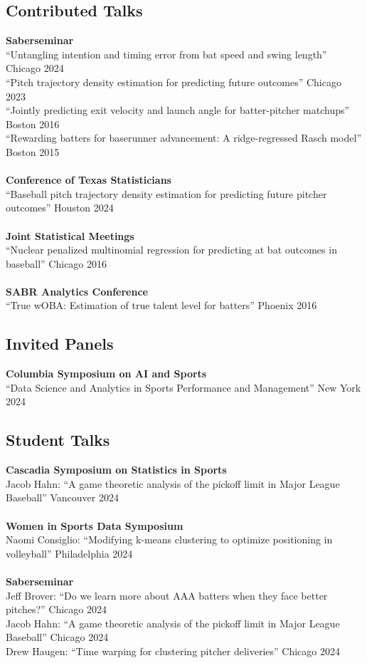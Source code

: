 \documentclass{article}
\begin{document}
\subsection*{\sc Contributed Talks}

{\bf Saberseminar}\\
``Untangling intention and timing error from bat speed and swing length'' \hfill Chicago 2024\\
``Pitch trajectory density estimation for predicting future outcomes'' \hfill Chicago 2023\\
``Jointly predicting exit velocity and launch angle for batter-pitcher matchups'' \hfill Boston 2016\\
``Rewarding batters for baserunner advancement: A ridge-regressed Rasch model'' \hfill Boston 2015\\
~\\
{\bf Conference of Texas Statisticians}\\
``Baseball pitch trajectory density estimation for predicting future pitcher outcomes'' \hfill Houston 2024\\
~\\
{\bf Joint Statistical Meetings}\\
``Nuclear penalized multinomial regression for predicting at bat outcomes in baseball'' \hfill Chicago 2016\\
~\\
{\bf SABR Analytics Conference}\\
``True wOBA: Estimation of true talent level for batters'' \hfill Phoenix 2016

\subsection*{\sc Invited Panels}

{\bf Columbia Symposium on AI and Sports}\\
``Data Science and Analytics in Sports Performance and Management'' \hfill New York 2024

\subsection*{\sc Student Talks}

{\bf Cascadia Symposium on Statistics in Sports}\\
Jacob Hahn: ``A game theoretic analysis of the pickoff limit in Major League Baseball'' \hfill Vancouver 2024\\
~\\
{\bf Women in Sports Data Symposium}\\
Naomi Consiglio: ``Modifying k-means clustering to optimize positioning in volleyball'' \hfill Philadelphia 2024\\
~\\
{\bf Saberseminar}\\
Jeff Brover: ``Do we learn more about AAA batters when they face better pitches?'' \hfill Chicago 2024\\
Jacob Hahn: ``A game theoretic analysis of the pickoff limit in Major League Baseball'' \hfill Chicago 2024\\
Drew Haugen: ``Time warping for clustering pitcher deliveries'' \hfill Chicago 2024
\end{document}
